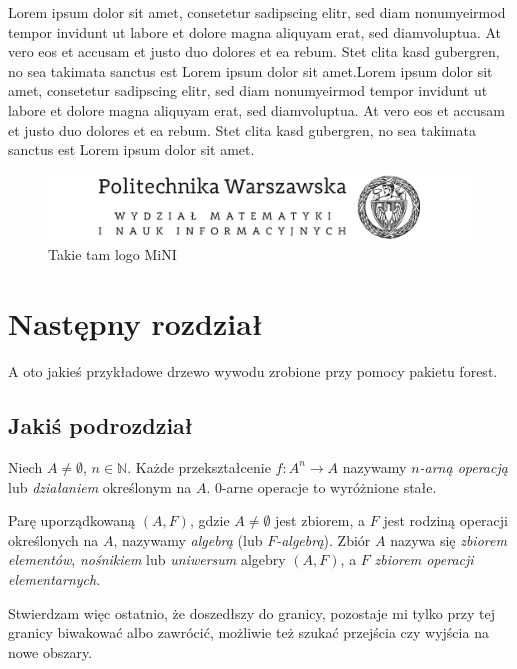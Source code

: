 \documentclass[en]{minipw} %
\begin{document}
Lorem ipsum dolor sit amet, consetetur sadipscing elitr, sed diam nonumyeirmod tempor invidunt ut labore et dolore magna aliquyam erat, sed diamvoluptua. At vero eos et accusam et justo duo dolores et ea rebum. Stet clita kasd gubergren, no sea takimata sanctus est Lorem ipsum dolor sit amet.Lorem ipsum dolor sit amet, consetetur sadipscing elitr, sed diam nonumyeirmod tempor invidunt ut labore et dolore magna aliquyam erat, sed diamvoluptua. At vero eos et accusam et justo duo dolores et ea rebum. Stet clita kasd gubergren, no sea takimata sanctus est Lorem ipsum dolor sit amet.

\begin{figure}[h!]
\centering
\includegraphics[scale=0.5]{politechnika}
\caption[Logo MiNI]{Takie tam logo MiNI}
\end{figure}


\chapter{Następny rozdział}

A oto jakieś przykładowe drzewo wywodu zrobione przy pomocy pakietu forest.

\section{Jakiś podrozdział}


\begin{definition}
Niech $A\neq \emptyset$, $n \in \mathbb{N}$. Każde przekształcenie $f:A^n \rightarrow A$ nazywamy \textit{$n$-arną operacją} lub \textit{działaniem} określonym na $A$.
0-arne operacje to wyróżnione stałe.
\end{definition}


\begin{definition}[Algebra]
Parę uporządkowaną $(A,F)$, gdzie $A\neq \emptyset$ jest zbiorem, a $F$ jest rodziną operacji określonych na $A$, nazywamy \textit{algebrą} (lub \textit{$F$-algebrą}). Zbiór $A$ nazywa się \textit{zbiorem elementów}, \textit{nośnikiem} lub \textit{uniwersum} algebry $(A,F)$, a $F$ \textit{zbiorem operacji elementarnych}.
\end{definition}

\begin{proposition}
Stwierdzam więc ostatnio, że doszedłszy do granicy, pozostaje mi tylko przy tej granicy biwakować albo zawrócić, możliwie też szukać przejścia czy wyjścia na nowe obszary.
\end{proposition}
\end{document}
